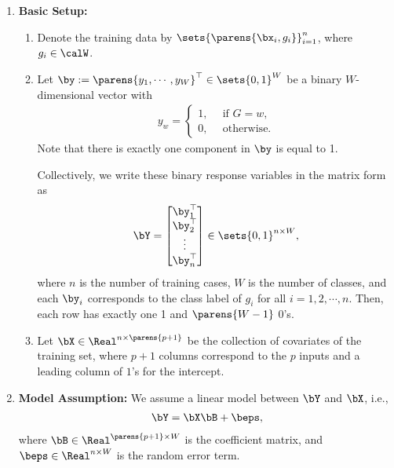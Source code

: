 \documentclass[12pt]{article}
\begin{document}
\begin{enumerate}[label=\textbf{\arabic*.}]

	\item \textbf{Basic Setup:} 
	
	\begin{enumerate}
		\item Denote the training data by $\sets{\parens{\bx_i, g_i}}_{i=1}^n$, where $g_i \in \calW$. 
		
		\item Let $\by := \parens{y_1, \cdots, y_W}^\top \in \sets{0, 1}^W$ be a binary $W$-dimensional vector with 
		\begin{align*}
			y_w = \begin{cases}
				1, & \, \text{ if } G = w, \\ 
				0, & \, \text{ otherwise}. 
			\end{cases}
		\end{align*}
		Note that there is exactly one component in $\by$ is equal to 1. 
		
		Collectively, we write these binary response variables in the matrix form as 
		\begin{align*}
			\bY = \begin{bmatrix}
				\by_1^\top \\ \by_2^\top \\ \vdots \\ \by_n^\top
			\end{bmatrix} \in \sets{ 0, 1 }^{n \times W}, 
		\end{align*}
		where $n$ is the number of training cases, $W$ is the number of classes, and each $\by_i$ corresponds to the class label of $g_i$ for all $i = 1, 2, \cdots, n$. Then, each row has exactly one 1 and $\parens{W - 1}$ 0's. 
		
		\item Let $\bX \in \Real^{n \times \parens{p+1}}$ be the collection of covariates of the training set, where $ p+1 $ columns correspond to the $p$ inputs and a leading column of $1$'s for the intercept. 
		
	\end{enumerate}
	
	\item \textbf{Model Assumption:} We assume a linear model between $\bY$ and $\bX$, i.e., 
	\begin{align*}
		\bY = \bX \bB + \beps, 
	\end{align*}
	where $\bB \in \Real^{\parens{p+1} \times W}$ is the coefficient matrix, and $\beps \in \Real^{n \times W}$ is the random error term. 
	

\end{enumerate}
\end{document}
